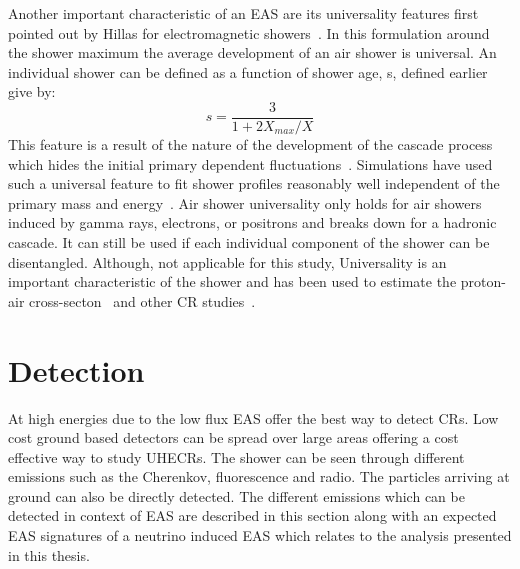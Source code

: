 Another important characteristic of an EAS are its universality features first pointed out by Hillas for electromagnetic showers~\cite{A_M_Hillas_1982}. In this formulation around the shower maximum the average development of an air shower is universal. An individual shower can be defined as a function of shower age, s, defined earlier give by:
\begin{equation}
    s = \frac{3}{1+2 X_{max}/X}
\end{equation}
This feature is a result of the nature of the development of the cascade process which hides the initial primary dependent fluctuations~\cite{}. Simulations have used such a universal feature to fit shower profiles reasonably well independent of the primary mass and energy~\cite{Bridgeman:2017MD}. Air shower universality only holds for air showers induced by gamma rays, electrons, or positrons and breaks down for a hadronic cascade. It can still be used if each individual component of the shower can be disentangled. Although, not applicable for this study, Universality is an important characteristic of the shower and has been used to estimate the proton-air cross-secton~\cite{Ulrich_2009} and other CR studies~\cite{cazon2024protonairinteractionsultrahighenergies}.

\section{Detection}
\label{sec:EAS_det}
At high energies due to the low flux EAS offer the best way to detect CRs. Low cost ground based detectors can be spread over large areas offering a cost effective way to study UHECRs. The shower can be seen through different emissions such as the Cherenkov, fluorescence and radio. The particles arriving at ground can also be directly detected. The different emissions which can be detected in context of EAS are described in this section along with an expected EAS signatures of a neutrino induced EAS which relates to the analysis presented in this thesis.

